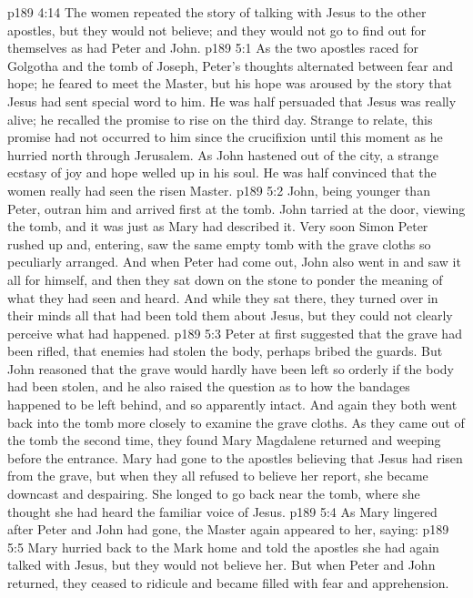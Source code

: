 \vs p189 4:14 The women repeated the story of talking with Jesus to the other apostles, but they would not believe; and they would not go to find out for themselves as had Peter and John.
\vs p189 5:1 As the two apostles raced for Golgotha and the tomb of Joseph, Peter’s thoughts alternated between fear and hope; he feared to meet the Master, but his hope was aroused by the story that Jesus had sent special word to him. He was half persuaded that Jesus was really alive; he recalled the promise to rise on the third day. Strange to relate, this promise had not occurred to him since the crucifixion until this moment as he hurried north through Jerusalem. As John hastened out of the city, a strange ecstasy of joy and hope welled up in his soul. He was half convinced that the women really had seen the risen Master.
\vs p189 5:2 John, being younger than Peter, outran him and arrived first at the tomb. John tarried at the door, viewing the tomb, and it was just as Mary had described it. Very soon Simon Peter rushed up and, entering, saw the same empty tomb with the grave cloths so peculiarly arranged. And when Peter had come out, John also went in and saw it all for himself, and then they sat down on the stone to ponder the meaning of what they had seen and heard. And while they sat there, they turned over in their minds all that had been told them about Jesus, but they could not clearly perceive what had happened.
\vs p189 5:3 Peter at first suggested that the grave had been rifled, that enemies had stolen the body, perhaps bribed the guards. But John reasoned that the grave would hardly have been left so orderly if the body had been stolen, and he also raised the question as to how the bandages happened to be left behind, and so apparently intact. And again they both went back into the tomb more closely to examine the grave cloths. As they came out of the tomb the second time, they found Mary Magdalene returned and weeping before the entrance. Mary had gone to the apostles believing that Jesus had risen from the grave, but when they all refused to believe her report, she became downcast and despairing. She longed to go back near the tomb, where she thought she had heard the familiar voice of Jesus.
\vs p189 5:4 As Mary lingered after Peter and John had gone, the Master again appeared to her, saying: 
\vs p189 5:5 Mary hurried back to the Mark home and told the apostles she had again talked with Jesus, but they would not believe her. But when Peter and John returned, they ceased to ridicule and became filled with fear and apprehension.
\quizlink
